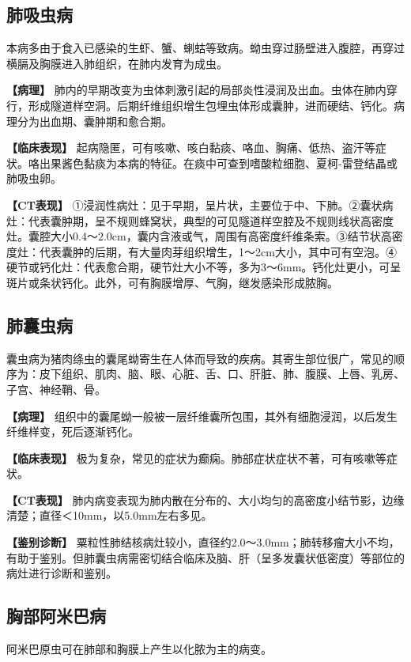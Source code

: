 \subsection{肺吸虫病}

本病多由于食入已感染的生虾、蟹、蝲蛄等致病。蚴虫穿过肠壁进入腹腔，再穿过横膈及胸膜进入肺组织，在肺内发育为成虫。

\textbf{【病理】}
肺内的早期改变为虫体刺激引起的局部炎性浸润及出血。虫体在肺内穿行，形成隧道样空洞。后期纤维组织增生包埋虫体形成囊肿，进而硬结、钙化。病理分为出血期、囊肿期和愈合期。

\textbf{【临床表现】}
起病隐匿，可有咳嗽、咳白黏痰、咯血、胸痛、低热、盗汗等症状。咯出果酱色黏痰为本病的特征。在痰中可查到嗜酸粒细胞、夏柯-雷登结晶或肺吸虫卵。

\textbf{【CT表现】}
①浸润性病灶：见于早期，呈片状，主要位于中、下肺。②囊状病灶：代表囊肿期，呈不规则蜂窝状，典型的可见隧道样空腔及不规则线状高密度灶。囊腔大小0.4～2.0cm，囊内含液或气，周围有高密度纤维条索。③结节状高密度灶：代表囊肿的后期，有大量肉芽组织增生，1～2cm大小，其中可有空泡。④硬节或钙化灶：代表愈合期，硬节灶大小不等，多为3～6mm。钙化灶更小，可呈斑片或条状钙化。此外，可有胸膜增厚、气胸，继发感染形成脓胸。

\subsection{肺囊虫病}

囊虫病为猪肉绦虫的囊尾蚴寄生在人体而导致的疾病。其寄生部位很广，常见的顺序为：皮下组织、肌肉、脑、眼、心脏、舌、口、肝脏、肺、腹膜、上唇、乳房、子宫、神经鞘、骨。

\textbf{【病理】}
组织中的囊尾蚴一般被一层纤维囊所包围，其外有细胞浸润，以后发生纤维样变，死后逐渐钙化。

\textbf{【临床表现】}
极为复杂，常见的症状为癫痫。肺部症状症状不著，可有咳嗽等症状。

\textbf{【CT表现】}
肺内病变表现为肺内散在分布的、大小均匀的高密度小结节影，边缘清楚；直径＜10mm，以5.0mm左右多见。

\textbf{【鉴别诊断】}
粟粒性肺结核病灶较小，直径约2.0～3.0mm；肺转移瘤大小不均，有助于鉴别。但肺囊虫病需密切结合临床及脑、肝（呈多发囊状低密度）等部位的病灶进行诊断和鉴别。

\subsection{胸部阿米巴病}

阿米巴原虫可在肺部和胸膜上产生以化脓为主的病变。


